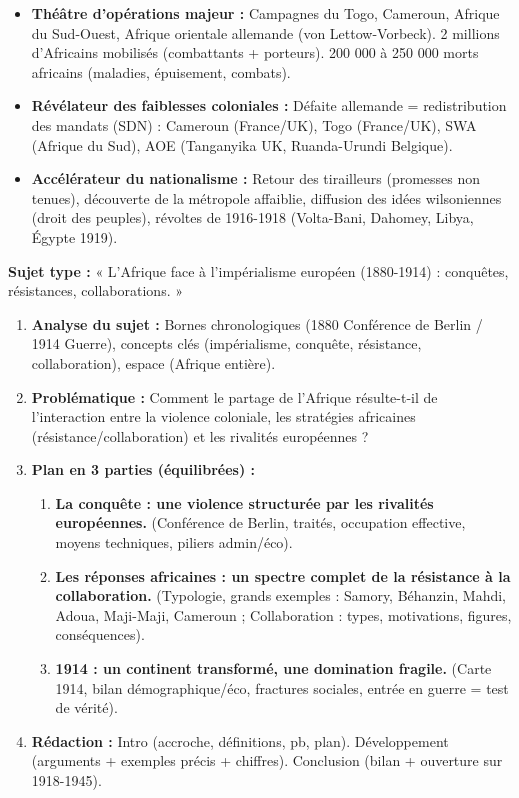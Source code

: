 \documentclass[11pt]{article}
\begin{document}
\begin{aretenir}
\begin{itemize}
    \item \textbf{Théâtre d'opérations majeur :} Campagnes du Togo, Cameroun, Afrique du Sud-Ouest, Afrique orientale allemande (von Lettow-Vorbeck). 2 millions d'Africains mobilisés (combattants + porteurs). 200 000 à 250 000 morts africains (maladies, épuisement, combats).
    \item \textbf{Révélateur des faiblesses coloniales :} Défaite allemande = redistribution des mandats (SDN) : Cameroun (France/UK), Togo (France/UK), SWA (Afrique du Sud), AOE (Tanganyika UK, Ruanda-Urundi Belgique).
    \item \textbf{Accélérateur du nationalisme :} Retour des tirailleurs (promesses non tenues), découverte de la métropole affaiblie, diffusion des idées wilsoniennes (droit des peuples), révoltes de 1916-1918 (Volta-Bani, Dahomey, Libya, Égypte 1919).
\end{itemize}
\end{aretenir}

\begin{methode}
\textbf{Sujet type :} « L'Afrique face à l'impérialisme européen (1880-1914) : conquêtes, résistances, collaborations. »
\begin{enumerate}
    \item \textbf{Analyse du sujet :} Bornes chronologiques (1880 Conférence de Berlin / 1914 Guerre), concepts clés (impérialisme, conquête, résistance, collaboration), espace (Afrique entière).
    \item \textbf{Problématique :} Comment le partage de l'Afrique résulte-t-il de l'interaction entre la violence coloniale, les stratégies africaines (résistance/collaboration) et les rivalités européennes ?
    \item \textbf{Plan en 3 parties (équilibrées) :}
    \begin{enumerate}
        \item \textbf{La conquête : une violence structurée par les rivalités européennes.} (Conférence de Berlin, traités, occupation effective, moyens techniques, piliers admin/éco).
        \item \textbf{Les réponses africaines : un spectre complet de la résistance à la collaboration.} (Typologie, grands exemples : Samory, Béhanzin, Mahdi, Adoua, Maji-Maji, Cameroun ; Collaboration : types, motivations, figures, conséquences).
        \item \textbf{1914 : un continent transformé, une domination fragile.} (Carte 1914, bilan démographique/éco, fractures sociales, entrée en guerre = test de vérité).
    \end{enumerate}
    \item \textbf{Rédaction :} Intro (accroche, définitions, pb, plan). Développement (arguments + exemples précis + chiffres). Conclusion (bilan + ouverture sur 1918-1945).
\end{enumerate}
\end{methode}
\end{document}
